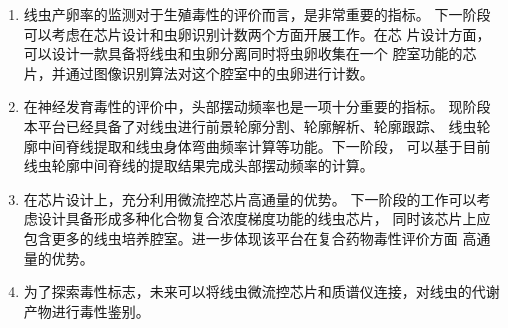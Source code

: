 	\begin{enumerate}[label={(\arabic*)},font={\color{black!50!black}\bfseries}]
	\item 线虫产卵率的监测对于生殖毒性的评价而言，是非常重要的指标。
	下一阶段可以考虑在芯片设计和虫卵识别计数两个方面开展工作。在芯
	片设计方面，可以设计一款具备将线虫和虫卵分离同时将虫卵收集在一个
	腔室功能的芯片，并通过图像识别算法对这个腔室中的虫卵进行计数。
	\item 在神经发育毒性的评价中，头部摆动频率也是一项十分重要的指标。
	现阶段本平台已经具备了对线虫进行前景轮廓分割、轮廓解析、轮廓跟踪、
	线虫轮廓中间脊线提取和线虫身体弯曲频率计算等功能。下一阶段，
	可以基于目前线虫轮廓中间脊线的提取结果完成头部摆动频率的计算。
	\item 在芯片设计上，充分利用微流控芯片高通量的优势。
	下一阶段的工作可以考虑设计具备形成多种化合物复合浓度梯度功能的线虫芯片，
	同时该芯片上应包含更多的线虫培养腔室。进一步体现该平台在复合药物毒性评价方面
	高通量的优势。
	\item 为了探索毒性标志，未来可以将线虫微流控芯片和质谱仪连接，对线虫的代谢产物进行毒性鉴别。

	\end{enumerate}








